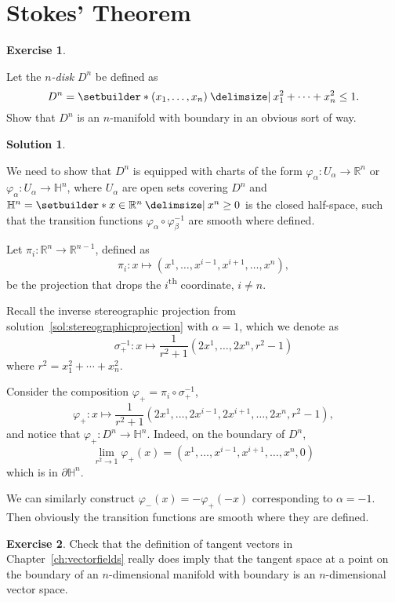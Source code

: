 \documentclass[11pt, a4paper]{report}
\theoremstyle{definition}
\newtheorem{ex}{Exercise}[part]
\newtheorem{sol}{Solution}[part]
\begin{document}
\section{Stokes' Theorem}

\begin{ex}\label{ex:ndisk}

Let the \emph{$n$-disk} $D^n$ be defined as
\[
    D^n = \setbuilder*{(x_1, \ldots, x_n) \given x_1^2 + \cdots + x_n^2 \leq 1}.
\]
Show that $D^n$ is an $n$-manifold with boundary in an obvious sort of way.

\end{ex}

\begin{sol}\label{sol:ndisk}

We need to show that $D^n$ is equipped with charts of the form $\varphi_\alpha: U_\alpha \to \mathbb{R}^n$ or $\varphi_\alpha: U_\alpha \to \mathbb{H}^n$, where $U_\alpha$ are open sets covering $D^n$ and $\mathbb{H}^n = \setbuilder*{x \in \mathbb{R}^n \given x^n \geq 0}$ is the closed half-space, such that the transition functions $\varphi_\alpha \circ \varphi_\beta^{-1}$ are smooth where defined.

Let $\pi_i: \mathbb{R}^{n} \to \mathbb{R}^{n - 1}$, defined as
\[
    \pi_i: x \mapsto (x^1, \ldots, x^{i - 1}, x^{i + 1}, \ldots, x^{n}),
\]
be the projection that drops the $i$\textsuperscript{th} coordinate, $i \neq n$.

Recall the inverse stereographic projection from solution~\ref{sol:stereographicprojection} with $\alpha = 1$, which we denote as
\[
    \sigma_+^{-1}: x \mapsto \frac{1}{r^2 + 1} (2x^1, \ldots, 2x^n, r^2 - 1)
\]
where $r^2 = x_1^2 + \cdots + x_n^2$.

Consider the composition $\varphi_+ = \pi_i \circ \sigma_+^{-1}$,
\[
    \varphi_+: x \mapsto \frac{1}{r^2 + 1} (2x^1, \ldots, 2x^{i - 1}, 2x^{i + 1}, \ldots, 2x^n, r^2 - 1),
\]
and notice that $\varphi_+: D^n \to \mathbb{H}^n$. Indeed, on the boundary of $D^n$,
\[
    \lim_{r^2 \to 1} \varphi_+(x) = (x^1, \ldots, x^{i - 1}, x^{i + 1}, \ldots, x^n, 0)
\]
which is in $\partial \mathbb{H}^n$.

We can similarly construct $\varphi_-(x) = -\varphi_+(-x)$ corresponding to $\alpha = -1$. Then obviously the transition functions are smooth where they are defined.

\end{sol}

\begin{ex}

Check that the definition of tangent vectors in Chapter~\ref{ch:vectorfields} really does imply that the tangent space at a point on the boundary of an $n$-dimensional manifold with boundary is an $n$-dimensional vector space.

\end{ex}
\end{document}
